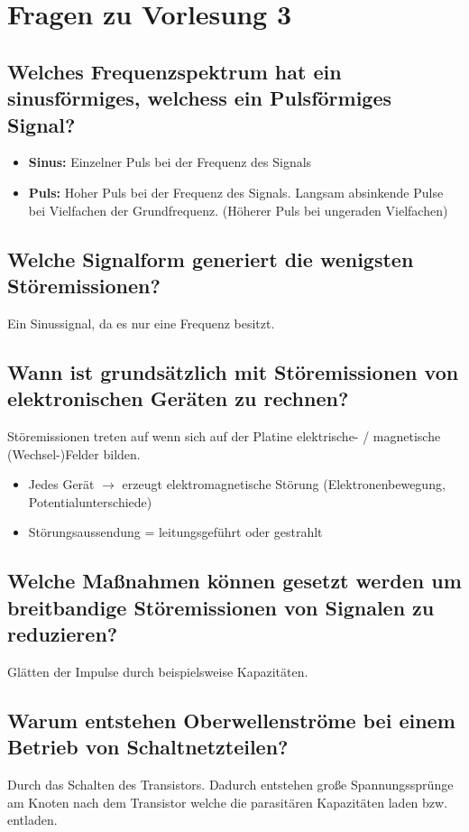 \section{Fragen zu Vorlesung 3}

\subsection{Welches Frequenzspektrum hat ein sinusförmiges, welchess ein Pulsförmiges Signal?}\label{sec:lv3:freq_spekt}
\begin{itemize}
  \item \textbf{Sinus:} Einzelner Puls bei der Frequenz des Signals
  \item \textbf{Puls:} Hoher Puls bei der Frequenz des Signals. Langsam absinkende Pulse bei Vielfachen der Grundfrequenz. (Höherer Puls bei ungeraden Vielfachen)
\end{itemize}

\subsection{Welche Signalform generiert die wenigsten Störemissionen?}
Ein Sinussignal, da es nur eine Frequenz besitzt.

\subsection{Wann ist grundsätzlich mit Störemissionen von elektronischen Geräten zu rechnen?}
Störemissionen treten auf wenn sich auf der Platine elektrische- / magnetische (Wechsel-)Felder bilden.

\begin{itemize}
  \item Jedes Gerät \(\rightarrow\) erzeugt elektromagnetische Störung (Elektronenbewegung, Potentialunterschiede)
  \item Störungsaussendung = leitungsgeführt oder gestrahlt
\end{itemize}

\subsection{Welche Maßnahmen können gesetzt werden um breitbandige Störemissionen von Signalen zu reduzieren?}
Glätten der Impulse durch beispielsweise Kapazitäten.

\subsection{Warum entstehen Oberwellenströme bei einem Betrieb von Schaltnetzteilen?}
Durch das Schalten des Transistors. Dadurch entstehen große Spannungssprünge am Knoten nach dem Transistor welche die parasitären Kapazitäten laden bzw. entladen.


